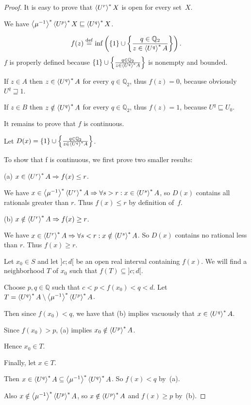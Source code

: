 \begin{proof}
It is easy to prove that $\left\langle U^r\right\rangle ^{\ast}X$ is open for every set~$X$.

We have $\left\langle \mu^{-1}\right\rangle ^{\ast}\left\langle U^p\right\rangle ^{\ast}X\sqsubseteq\left\langle U^q\right\rangle ^{\ast}X$.

\[ f (z) \overset{\mathrm{def}}{=} \inf \left( \{ 1 \} \cup \left\{ \frac{ q \in
   \mathbb{Q}_2 }{ z \in \left\langle U^q\right\rangle ^{\ast}
   A }\right\} \right). \]
$f$ is properly defined because $\{ 1 \} \cup \left\{ \frac{ q \in \mathbb{Q}_2
}{ z \in \left\langle U^q\right\rangle ^{\ast} A }\right\}$ is
nonempty and bounded.

If $z \in A$ then $z \in \left\langle U^q\right\rangle ^{\ast} A$ for every $q \in
\mathbb{Q}_2$, thus $f (z) = 0$, because obviously $U^q \sqsupseteq 1$.

If $z \in B$ then $z \notin \left\langle U^q\right\rangle ^{\ast} A$ for every $q \in
\mathbb{Q}_2$, thus $f (z) = 1$, because $U^q \sqsubseteq U_0$.

It remains to prove that $f$ is continuous.

Let $D (x) = \{ 1 \} \cup \left\{ \frac{ q \in \mathbb{Q}_2 }{
z \in \left\langle U^q\right\rangle ^{\ast} A }\right\}$.

To show that f is continuous, we first prove two smaller results:

(a) $x\in\left\langle U^r\right\rangle ^{\ast}A \Rightarrow f(x)\leq r$.

We have $x\in\left\langle \mu^{-1}\right\rangle ^{\ast}\left\langle U^r\right\rangle ^{\ast}A \Rightarrow \forall s>r:x\in\left\langle U^s\right\rangle ^{\ast}A$,
so $D(x)$ contains all rationals greater than $r$. Thus $f(x)\leq r$ by definition of~$f$.

(b) $x\notin\left\langle U^r\right\rangle ^{\ast}A \Rightarrow f(x)\geq r$.

We have $x\in\left\langle U^r\right\rangle ^{\ast}A \Rightarrow \forall s<r:x\notin\left\langle U^s\right\rangle ^{\ast}A$.
So $D(x)$ contains no rational less than $r$. Thus $f(x)\geq r$.

Let $x_0\in S$ and let $]c;d[$ be an open real interval containing $f(x)$.
We will find a neighborhood $T$ of $x_0$ such that $f(T)\subseteq]c;d[$.

Choose $p,q\in\mathbb{Q}$ such that $c < p < f(x_0) < q < d$. Let $T=\left\langle U^q\right\rangle ^{\ast}A\setminus\left\langle \mu^{-1}\right\rangle ^{\ast}\left\langle U^p\right\rangle ^{\ast}A$.

Then since $f(x_0)<q$, we have that (b) implies vacuously that $x\in\left\langle U^q\right\rangle ^{\ast}A$.

Since $f(x_0)>p$, (a) implies $x_0\notin\left\langle U^p\right\rangle ^{\ast}A$.

Hence $x_0\in T$.

Finally, let $x\in T$.

Then $x\in\left\langle U^q\right\rangle ^{\ast}A\subseteq\left\langle \mu^{-1}\right\rangle ^{\ast}\left\langle U^q\right\rangle ^{\ast}A$. So $f(x)<q$ by~(a).

Also $x\notin\left\langle \mu^{-1}\right\rangle ^{\ast}\left\langle U^p\right\rangle ^{\ast}A$, so $x\notin\left\langle U^p\right\rangle ^{\ast}A$ and $f(x)\geq p$ by~(b).


\end{proof}
